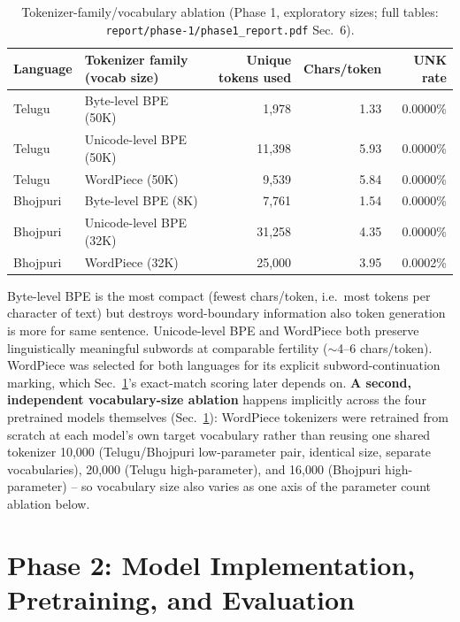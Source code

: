 \documentclass[10pt,a4paper]{article}
\begin{document}
\begin{table}[H]\centering\footnotesize
\begin{tabular}{llrrr}
\toprule
Language & Tokenizer family (vocab size) & Unique tokens used & Chars/token & UNK rate \\
\midrule
Telugu   & Byte-level BPE (50K)   & 1,978  & 1.33 & 0.0000\% \\
Telugu   & Unicode-level BPE (50K)& 11,398 & 5.93 & 0.0000\% \\
Telugu   & WordPiece (50K)        & 9,539  & 5.84 & 0.0000\% \\
Bhojpuri & Byte-level BPE (8K)    & 7,761  & 1.54 & 0.0000\% \\
Bhojpuri & Unicode-level BPE (32K)& 31,258 & 4.35 & 0.0000\% \\
Bhojpuri & WordPiece (32K)        & 25,000 & 3.95 & 0.0002\% \\
\bottomrule
\end{tabular}
\caption{Tokenizer-family/vocabulary ablation (Phase 1, exploratory sizes; full tables:
\texttt{report/phase-1/phase1\_report.pdf} Sec.\ 6).}
\label{tab:tok-ablation}
\end{table}
\vspace{-8pt}

Byte-level BPE is the most compact (fewest chars/token, i.e.\ most tokens per character of text)
but destroys word-boundary information also token generation is more for same sentence. Unicode-level BPE and WordPiece both preserve
linguistically meaningful subwords at comparable fertility ($\sim$4--6 chars/token). WordPiece was
selected for both languages for its explicit subword-continuation marking, which
Sec.~\ref{sec:phase2}'s exact-match scoring later depends on. \textbf{A second, independent
vocabulary-size ablation} happens implicitly across the four pretrained models themselves
(Sec.~\ref{sec:phase2}): WordPiece tokenizers were retrained from scratch at each model's own
target vocabulary rather than reusing one shared tokenizer 10,000 (Telugu/Bhojpuri
low-parameter pair, identical size, separate vocabularies), 20,000 (Telugu high-parameter), and
16,000 (Bhojpuri high-parameter) -- so vocabulary size also varies as one axis of the
parameter count ablation below.

\section{Phase 2: Model Implementation, Pretraining, and Evaluation}
\label{sec:phase2}
\vspace{-2pt}
\end{document}
